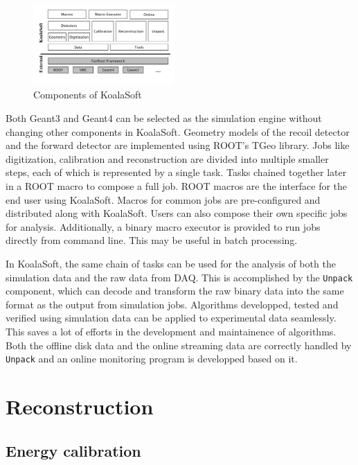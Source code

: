\documentclass[number,5p]{elsarticle}
\begin{document}
\begin{figure}[htbp]
  \centering
  \includegraphics[width=0.48\textwidth]{./koalasoft_components.png}
  \caption{Components of KoalaSoft}
  \label{fig:koalasoft}
\end{figure}

Both Geant3 and Geant4 can be selected as the simulation engine without changing other components in KoalaSoft.
Geometry models of the recoil detector and the forward detector are implemented using ROOT's TGeo library.
Jobs like digitization, calibration and reconstruction are divided into multiple smaller steps, each of which is represented by a single task.
Tasks chained together later in a ROOT macro to compose a full job. 
ROOT macros are the interface for the end user using KoalaSoft.
Macros for common jobs are pre-configured and distributed along with KoalaSoft.
Users can also compose their own specific jobs for analysis.
Additionally, a binary macro executor is provided to run jobs directly from command line. This may be useful in batch processing.

In KoalaSoft, the same chain of tasks can be used for the analysis of both the simulation data and the raw data from DAQ.
This is accomplished by the \texttt{Unpack} component, which can decode and transform the raw binary data into the same format as the output from simulation jobs.
Algorithms developped, tested and verified using simulation data can be applied to experimental data seamlessly.
This saves a lot of efforts in the development and maintainence of algorithms.
Both the offline disk data and the online streaming data are correctly handled by \texttt{Unpack} and an online monitoring program is developped based on it.

\section{Reconstruction}
\label{sec:reconstruction}

\subsection{Energy calibration}
\label{sec:calibration}
\end{document}
